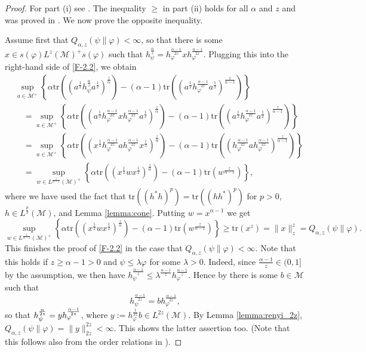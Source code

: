 \documentclass[12pt]{article}
\theoremstyle{definition}
\theoremstyle{remark}
\numberwithin{equation}{section}
\def\Me{\mathcal M}
\def\Tr{\mathrm{tr}}
\def\ffi{\varphi}
\begin{document}
\begin{proof} For part (i) see \cite[Theorem 1(vi)]{kato2023onrenyi}. The inequality $\ge$ in part (ii)
holds for all $\alpha$ and $z$ and was proved in \cite[Theorem 2(vi)]{kato2023onrenyi}. We now prove
the opposite inequality. 

Assume first that $Q_{\alpha,z}(\psi\|\varphi)<\infty$, so that there is some $x\in
s(\varphi)L^z(\Me)^+s(\varphi)$ such that
$h_\psi^{\frac{\alpha}{z}}=h_\varphi^{\frac{\alpha-1}{2z}}xh_\varphi^{\frac{\alpha-1}{2z}}$. Plugging this
into the right-hand side of \eqref{F-2.2}, we obtain
\begin{align}
&\sup_{a\in \Me^+} \left\{\alpha
\Tr\left((a^{\frac12}h_\psi^{\frac{\alpha}{z}}a^{\frac12})^{\frac{z}{\alpha}}\right)-(\alpha-1)
\Tr\left((a^{\frac12}h_\varphi^{\frac{\alpha-1}{2z}}a^{\frac12})^{\frac{z}{\alpha-1}}\right) \right\}
\nonumber\\
&\quad=\sup_{a\in \Me^+} \left\{\alpha
\Tr\left((a^{\frac12}h_\varphi^{\frac{\alpha-1}{2z}}xh_\varphi^{\frac{\alpha-1}{2z}}
a^{\frac12})^{\frac{z}{\alpha}}\right)-(\alpha-1)
\Tr\left((a^{\frac12}h_\varphi^{\frac{\alpha-1}{2z}}a^{\frac12})^{\frac{z}{\alpha-1}}\right) \right\}
\nonumber\\
&\quad=\sup_{a\in \Me^+} \left\{\alpha
\Tr\left((x^{\frac12}h_\varphi^{\frac{\alpha-1}{2z}}ah_\varphi^{\frac{\alpha-1}{2z}}
x^{\frac12})^{\frac{z}{\alpha}}\right)-(\alpha-1)
\Tr\left((h_\varphi^{\frac{\alpha-1}{2z}}a h_\varphi^{\frac{\alpha-1}{2z}}
)^{\frac{z}{\alpha-1}}\right)\right\}\nonumber\\
&\quad=\sup_{w\in L^{\frac{z}{\alpha-1}}(\Me)^+} \left\{\alpha
\Tr\left((x^{\frac12}wx^{\frac12})^{\frac{z}{\alpha}}\right)-(\alpha-1)
\Tr\left(w^{\frac{z}{\alpha-1}}\right)
\right\}, \label{F-2.3}
\end{align}
where we have used the fact that $\Tr\left((h^*h)^p\right)=\Tr\left((hh^*)^p\right)$ for
$p>0$, $h\in L^{\frac{p}{2}}(\Me)$, and Lemma \ref{lemma:cone}.
 Putting $w=x^{\alpha-1}$ we
get
\[
\sup_{w\in L^{\frac{z}{\alpha-1}}(\Me)^+} \left\{\alpha
\Tr\left((x^{\frac12}wx^{\frac12})^{\frac{z}{\alpha}}\right)-(\alpha-1)
\Tr\left(w^{\frac{z}{\alpha-1}}\right)
\right\}\ge \Tr(x^z)=\|x\|_z^z= Q_{\alpha,z}(\psi\|\varphi).
\]
This finishes the proof of \eqref{F-2.2} in the case that $Q_{\alpha,z}(\psi\|\varphi)<\infty$. Note that
this holds if $z\ge \alpha-1>0$ and $\psi\le \lambda\varphi$ for some $\lambda>0$. {Indeed, since
$\frac{\alpha-1}{z}\in (0,1]$ by the assumption, we then have 
$h_\psi^{\frac{\alpha-1}{z}}\le \lambda^{\frac{\alpha-1}{z}}h_\varphi^{\frac{\alpha-1}{z}}$.
Hence by \cite[Lemma A.58]{hiai2021quantum} there is some $b\in \Me$ such that 
\[
h_\psi^{\frac{\alpha-1}{2z}}=bh_\varphi^{\frac{\alpha-1}{2z}},
\]
so that $h_\psi^{\alpha\over2z}=yh_\ffi^{\alpha-1\over2z}$, where
$y:=h_\varphi^{\frac{1}{2z}}b\in L^{2z}(\Me)$. By Lemma \ref{lemma:renyi_2z},
$Q_{\alpha,z}(\psi\|\varphi)=\|y\|_{2z}^{2z}<\infty$. This shows the latter assertion too.}
{(Note that this follows also from the order relations in \cite[Theorem 2(iii)]{kato2023onrenyi}).}


\end{proof}
\end{document}
